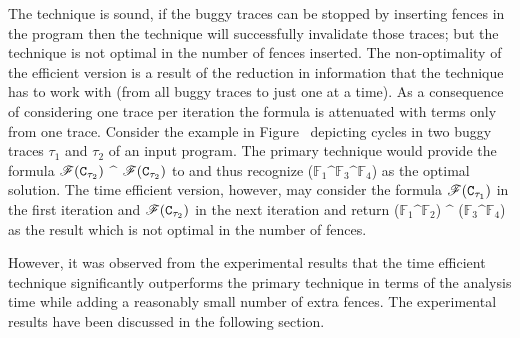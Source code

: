 The technique is sound, \ie if the buggy traces can be stopped by 
inserting \cc fences in the program then the technique will successfully
invalidate those traces;
but the technique is not optimal in the number of fences inserted.
The non-optimality of the efficient version is a result of the reduction
in information that the technique has to work with (from all buggy traces
to just one at a time). As a consequence of considering one trace per
iteration the \z formula is attenuated with terms only from one trace.
%
Consider the example in Figure~ 
depicting cycles in two buggy traces $\tau_1$ and $\tau_2$ of an 
input program. The primary \ourtechnique 
technique would provide the formula $\mathscr{F}({\tt C}_{\tau_2})$ $\^$ 
$\mathscr{F}({\tt C}_{\tau_2})$ to \z and thus recognize ($\mathbb{F}_1 \^ 
\mathbb{F}_3 \^ \mathbb{F}_4$) as the optimal solution.
The time efficient version, however, may consider the formula 
$\mathscr{F}({\tt C}_{\tau_1})$ in the first iteration and 
$\mathscr{F}({\tt C}_{\tau_2})$ in the next iteration and return
($\mathbb{F}_1 \^ \mathbb{F}_2$) $\^$ ($\mathbb{F}_3 \^ \mathbb{F}_4$) 
as the result which is not optimal in the number of fences.

However, it was observed from the experimental results that the time
efficient technique significantly outperforms the primary technique in terms of 
the analysis time while adding a reasonably small number of extra
fences. The experimental results have been discussed in the 
following section.